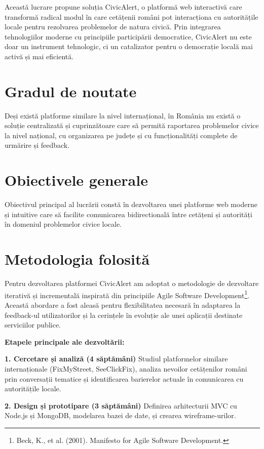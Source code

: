 \documentclass[12pt,a4paper]{report}
\begin{document}
Această lucrare  propune soluția CivicAlert, o platformă web interactivă care transformă radical modul în care cetățenii români pot interacționa cu autoritățile locale pentru rezolvarea problemelor de natura civică. Prin integrarea tehnologiilor moderne cu principiile participării democratice, CivicAlert nu este doar un instrument tehnologic, ci un catalizator pentru o democrație locală mai activă și mai eficientă.

\section*{Gradul de noutate}

Deși există platforme similare la nivel internațional, în România nu există o soluție centralizată și cuprinzătoare care să permită raportarea problemelor civice la nivel național, cu organizarea pe județe și cu funcționalități complete de urmărire și feedback.

\section*{Obiectivele generale}

Obiectivul principal al lucrării constă în dezvoltarea unei platforme web moderne și intuitive care să facilite comunicarea bidirectională între cetățeni și autorități în domeniul problemelor civice locale.

\section*{Metodologia folosită}

Pentru dezvoltarea platformei CivicAlert am adoptat o metodologie de dezvoltare iterativă și incrementală  inspirată din principiile Agile Software Development\footnote{Beck, K., et al. (2001). Manifesto for Agile Software Development.}. Această abordare a fost aleasă pentru flexibilitatea necesară în adaptarea la feedback-ul utilizatorilor și la cerințele în evoluție ale unei aplicații destinate serviciilor publice.

\textbf{Etapele principale ale dezvoltării:}

\textbf{1. Cercetare și analiză (4 săptămâni)}
Studiul platformelor similare internaționale (FixMyStreet, SeeClickFix), analiza nevoilor cetățenilor români prin conversații tematice și identificarea barierelor actuale în comunicarea cu autoritățile locale.

\textbf{2. Design și prototipare (3 săptămâni)}
Definirea arhitecturii MVC cu Node.js și MongoDB, modelarea bazei de date, și crearea wireframe-urilor.
\end{document}
